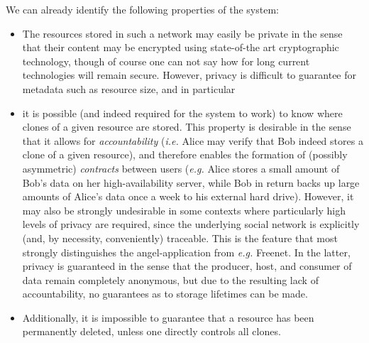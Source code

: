 \documentclass[11pt]{article}
\begin{document}
\begin{mainmatter}
We can already identify the following properties of the system:
\begin{itemize}
\item The resources stored in such a network may easily be private in the sense that their content may be encrypted using state-of-the art cryptographic technology, though of course one can not say how for long current technologies will remain secure. However, privacy is difficult to guarantee for metadata such as resource size, and in particular
\item it is possible (and indeed required for the system to work) to know where clones of a given resource are stored. This property is desirable in the sense that it allows for \emph{accountability} (\emph{i.e.} Alice may verify that Bob indeed stores a clone of a given resource), and therefore enables the formation of (possibly asymmetric) \emph{contracts} between users (\emph{e.g.} Alice stores a small amount of Bob's data on her high-availability server, while Bob in return backs up large amounts of Alice's data once a week to his external hard drive). However, it may also be strongly undesirable in some contexts where particularly high levels of privacy are required, since the underlying social network is explicitly (and, by necessity, conveniently) traceable. This is the feature that most strongly distinguishes the angel-application from \emph{e.g.} Freenet. In the latter, privacy is guaranteed in the sense that the producer, host, and consumer of data remain completely anonymous, but due to the resulting lack of accountability, no guarantees as to storage lifetimes can be made. 
\item Additionally, it is impossible to guarantee that a resource has been permanently deleted, unless one directly controls all clones.
\end{itemize} 


\end{mainmatter}
\end{document}
